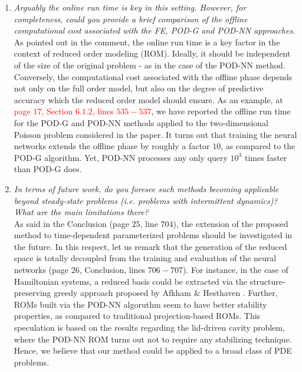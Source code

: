 \documentclass[longtitle]{elsarticle}
\theoremstyle{theorem}
\theoremstyle{definition}
\theoremstyle{remark}
\theoremstyle{proposition}
\numberwithin{figure}{section}
\begin{document}
\begin{enumerate}
			\item \emph{Arguably the online run time is key in this setting. However, for completeness, could you provide a brief comparison of the offline computational cost associated with the FE, POD-G and POD-NN approaches.} \\[0.3cm]
			As pointed out in the comment, the online run time is a key factor in the context of reduced order modeling (ROM). Ideally, it should be independent of the size of the original problem - as in the case of the POD-NN method. Conversely, the computational cost associated with the offline phase depends not only on the full order model, but also on the degree of predictive accuracy which the reduced order model should ensure. As an example, at \textcolor{red}{page $17$, Section $6.1.2$, lines $535-537$}, we have reported the offline run time for the POD-G and POD-NN methods applied to the two-dimensional Poisson problem considered in the paper. It turns out that training the neural networks extends the offline phase by roughly a factor $10$, as compared to the POD-G algorithm. Yet, POD-NN processes any only query $10^3$ times faster than POD-G does.

			\item \emph{In terms of future work, do you foresee such methods becoming applicable beyond steady-state problems (i.e. problems with intermittent dynamics)? What are the main limitations there?} \\[0.3cm]
			As said in the Conclusion (page $25$, line $704$), the extension of the proposed method to time-dependent parameterized problems should be investigated in the future. In this respect, let us remark that the generation of the reduced space is totally decoupled from the training and evaluation of the neural networks (page $26$, Conclusion, lines $706-707$). For instance, in the case of Hamiltonian systems, a reduced basis could be extracted via the structure-preserving greedy approach proposed by Afkham \& Hesthaven \cite{AH17}. Further, ROMs built via the POD-NN algoruthm seem to have better stability properties, as compared to traditional projection-based ROMs. This speculation is based on the results regarding the lid-driven cavity problem, where the POD-NN ROM turns out not to require any stabilizing technique. Hence, we believe that our method could be applied to a broad class of PDE problems.
		\end{enumerate}
\end{document}
